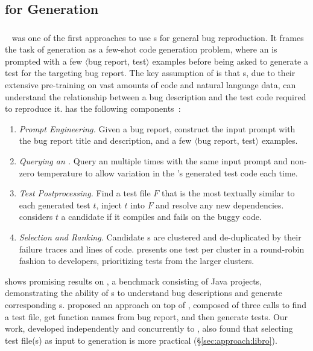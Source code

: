 \subsection{\llm for \brt Generation}
\label{sec:relatedwork:brt}

\subsubsection{\libro}
\label{sec:relatedwork:brt:libro}

\libro~\cite{kang2023large,kang2024evaluating} was one of the first approaches to use \llm{}s for general bug reproduction. 
It frames the task of \brt generation as a few-shot code generation problem, where an \llm is prompted with a few $\langle$bug report, test$\rangle$ examples before being asked to generate a test for the targeting bug report. 
The key assumption of \libro is that \llm{}s, due to their extensive pre-training on vast amounts of code and natural language data, can understand the relationship between a bug description and the test code required to reproduce it.
\libro has the following components~\cite{kang2023large}:
\begin{enumerate}
    \item \textit{Prompt Engineering.} Given a bug report, construct the input prompt with the bug report title and description, and a few $\langle$bug report, test$\rangle$ examples. 
    \item \textit{Querying an \llm.} Query an \llm multiple times with the same input prompt and non-zero temperature to allow variation in the \llm's generated test code each time.
    \item \textit{Test Postprocessing.} Find a test file $F$ that is the most textually similar to each generated test $t$, inject $t$ into $F$ and resolve any new dependencies. \libro considers $t$ a candidate \brt if it compiles and fails on the buggy code.
    \item \textit{Selection and Ranking.} Candidate \brt{}s are clustered and de-duplicated by their failure traces and lines of code. \libro presents one test per cluster in a round-robin fashion to developers, prioritizing tests from the larger clusters. 
\end{enumerate}

\libro shows promising results on , a benchmark consisting of Java projects, demonstrating the ability of \llm{}s to understand bug descriptions and generate corresponding \brt{}s.
\citet{ahmed2024tdd} proposed an approach on top of \libro, composed of three \llm calls to find a test file, get function names from bug report, and then generate tests.
Our work, developed independently and concurrently to \citet{ahmed2024tdd}, also found that selecting test file(s) as input to \brt generation is more practical (\S\ref{sec:approach:libro}).

